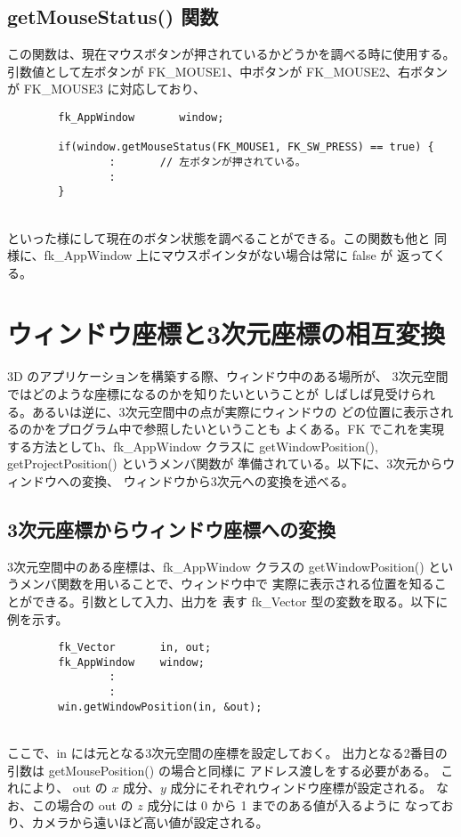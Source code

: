 \subsection*{getMouseStatus() 関数}
この関数は、現在マウスボタンが押されているかどうかを調べる時に使用する。
引数値として左ボタンが FK\_MOUSE1、中ボタンが FK\_MOUSE2、右ボタンが
FK\_MOUSE3 に対応しており、
\\
\begin{breakbox}
\begin{verbatim}
        fk_AppWindow       window;

        if(window.getMouseStatus(FK_MOUSE1, FK_SW_PRESS) == true) {
                :       // 左ボタンが押されている。
                :
        }
\end{verbatim}
\end{breakbox}
~ \\
といった様にして現在のボタン状態を調べることができる。この関数も他と
同様に、fk\_AppWindow 上にマウスポインタがない場合は常に false が
返ってくる。

\section{ウィンドウ座標と3次元座標の相互変換} \label{sec:coordinate}
3D のアプリケーションを構築する際、ウィンドウ中のある場所が、
3次元空間ではどのような座標になるのかを知りたいということが
しばしば見受けられる。あるいは逆に、3次元空間中の点が実際にウィンドウの
どの位置に表示されるのかをプログラム中で参照したいということも
よくある。FK でこれを実現する方法としてh、fk\_AppWindow クラスに
getWindowPosition(), getProjectPosition() というメンバ関数が
準備されている。以下に、3次元からウィンドウへの変換、
ウィンドウから3次元への変換を述べる。

\subsection{3次元座標からウィンドウ座標への変換}
3次元空間中のある座標は、fk\_AppWindow クラスの
getWindowPosition() というメンバ関数を用いることで、ウィンドウ中で
実際に表示される位置を知ることができる。引数として入力、出力を
表す fk\_Vector 型の変数を取る。以下に例を示す。
\\
\begin{breakbox}
\begin{verbatim}
        fk_Vector       in, out;
        fk_AppWindow    window;
                :
                :
        win.getWindowPosition(in, &out);
\end{verbatim}
\end{breakbox}
~ \\
ここで、in には元となる3次元空間の座標を設定しておく。
出力となる2番目の引数は getMousePosition() の場合と同様に
アドレス渡しをする必要がある。
これにより、
out の \(x\) 成分、\(y\) 成分にそれぞれウィンドウ座標が設定される。
なお、この場合の out の \(z\) 成分には 0 から 1 までのある値が入るように
なっており、カメラから遠いほど高い値が設定される。

